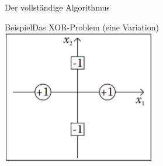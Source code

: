 \documentclass[hyperref={bookmarks=false},11pt,dvipsnames]{beamer}
\begin{document}
\begin{frame}[allowframebreaks]{Der vollständige Algorithmus}
	\begin{scriptsize}
		
		
	\end{scriptsize}
\end{frame}

\begin{frame}{Beispiel}{Das XOR-Problem (eine Variation)}
	\centering
	\includegraphics[width=0.5\textwidth]{../Ausarbeitung/figures/XOR-Problem.png}
\end{frame}
\end{document}
